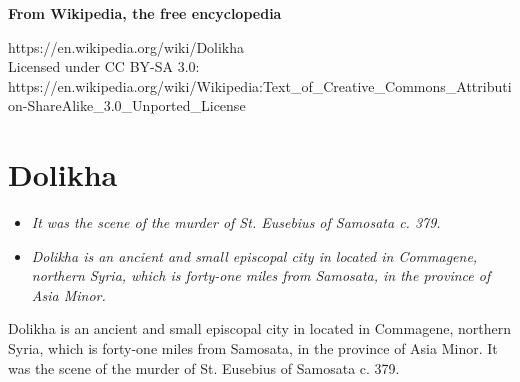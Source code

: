 \textbf{From Wikipedia, the free encyclopedia}

https://en.wikipedia.org/wiki/Dolikha\\
Licensed under CC BY-SA 3.0:\\
https://en.wikipedia.org/wiki/Wikipedia:Text\_of\_Creative\_Commons\_Attribution-ShareAlike\_3.0\_Unported\_License

\section{Dolikha}\label{dolikha}

\begin{itemize}
\item
  \emph{It was the scene of the murder of St. Eusebius of Samosata c.
  379.}
\item
  \emph{Dolikha is an ancient and small episcopal city in located in
  Commagene, northern Syria, which is forty-one miles from Samosata, in
  the province of Asia Minor.}
\end{itemize}

Dolikha is an ancient and small episcopal city in located in Commagene,
northern Syria, which is forty-one miles from Samosata, in the province
of Asia Minor. It was the scene of the murder of St. Eusebius of
Samosata c. 379.
